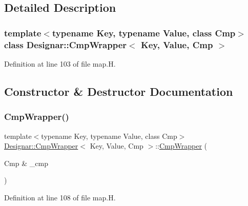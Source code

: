 \subsection{Detailed Description}
\subsubsection*{template$<$typename Key, typename Value, class Cmp$>$\newline
class Designar\+::\+Cmp\+Wrapper$<$ Key, Value, Cmp $>$}



Definition at line 103 of file map.\+H.



\subsection{Constructor \& Destructor Documentation}
\mbox{\label{class_designar_1_1_cmp_wrapper_a2fe493e155e893254b689c5933c61ebb}} 
\subsubsection{\texorpdfstring{Cmp\+Wrapper()}{CmpWrapper()}\hspace{0.1cm}{\footnotesize\ttfamily [1/4]}}
{\footnotesize\ttfamily template$<$typename Key, typename Value, class Cmp$>$ \\
\hyperlink{class_designar_1_1_cmp_wrapper}{Designar\+::\+Cmp\+Wrapper}$<$ Key, Value, Cmp $>$\+::\hyperlink{class_designar_1_1_cmp_wrapper}{Cmp\+Wrapper} (\begin{DoxyParamCaption}\item[{Cmp \&}]{\+\_\+cmp }\end{DoxyParamCaption})\hspace{0.3cm}{\ttfamily [inline]}}



Definition at line 108 of file map.\+H.

\mbox{\label{class_designar_1_1_cmp_wrapper_af471969d033f9f7b5d306a0755af43c6}} 
